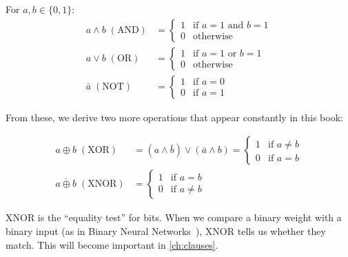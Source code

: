 \begin{definition}
\label{def:basic-ops}
For $a, b \in \{0, 1\}$:
\begin{align}
  a \wedge b \; (\text{AND}) &=
    \begin{cases} 1 & \text{if } a = 1 \text{ and } b = 1 \\ 0 & \text{otherwise} \end{cases}
    \label{eq:and} \\[6pt]
  a \vee b \; (\text{OR}) &=
    \begin{cases} 1 & \text{if } a = 1 \text{ or } b = 1 \\ 0 & \text{otherwise} \end{cases}
    \label{eq:or} \\[6pt]
  \bar{a} \; (\text{NOT}) &=
    \begin{cases} 1 & \text{if } a = 0 \\ 0 & \text{if } a = 1 \end{cases}
    \label{eq:not}
\end{align}
\end{definition}

From these, we derive two more operations that appear constantly in this
book:

\begin{definition}
\label{def:xor}
\begin{align}
  a \oplus b \; (\text{XOR}) &= (a \wedge \bar{b}) \vee (\bar{a} \wedge b)
    = \begin{cases} 1 & \text{if } a \neq b \\ 0 & \text{if } a = b \end{cases}
    \label{eq:xor} \\[6pt]
  \overline{a \oplus b} \; (\text{XNOR}) &=
    \begin{cases} 1 & \text{if } a = b \\ 0 & \text{if } a \neq b \end{cases}
    \label{eq:xnor}
\end{align}
\end{definition}

\begin{engineernote}
XNOR is the ``equality test'' for bits. When we compare a binary weight
with a binary input (as in Binary Neural Networks~\cite{courbariaux2016binarized, rastegari2016xnornet}), XNOR tells us
whether they match. This will become important in \cref{ch:clauses}.
\end{engineernote}


